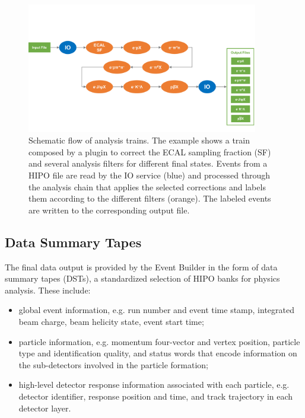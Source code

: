 \begin{figure}
  \centering
  \includegraphics[width=0.9\textwidth]{pics/train.pdf}
  \caption{Schematic flow of analysis trains.  The example shows a train composed by a plugin to correct the ECAL
      sampling fraction (SF) and several analysis filters for different final states. Events from a HIPO file are read
      by the IO service (blue) and processed through the analysis chain that applies the selected corrections and
      labels them according to the different filters (orange). The labeled events are written to the corresponding
      output file.}
    \label{fig:train}
\end{figure}

\subsection{Data Summary Tapes}
\label{sec:dsts}

The final data output is provided by the Event Builder in the form of data summary tapes (DSTs), a standardized
selection of HIPO banks for physics analysis. These include:

\begin{itemize}
\item global event information, e.g. run number and event time stamp, integrated beam charge, beam helicity state,
  event start time;
\item particle information, e.g. momentum four-vector and vertex position, particle type and identification quality,
  and status words that encode information on the sub-detectors involved in the particle formation;
\item high-level detector response information associated with each particle, e.g. detector identifier, response
  position and time, and track trajectory in each detector layer.
\end{itemize}

